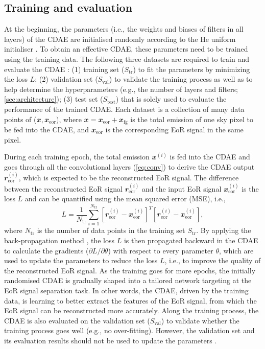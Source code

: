 \documentclass[fleqn,usenatbib]{mnras}
\newcommand{\R}[1]{\mathrm{#1}}
\newcommand{\B}[1]{\mathbfit{#1}}
\newcommand{\editone}[1]{{\leavevmode\color{cyan}#1}}
\begin{document}
\subsection{Training and evaluation}
\label{sec:train-eval}

\editone{%
At the beginning, the parameters (i.e., the weights and biases of filters
in all layers) of the CDAE are initialised randomly according to the He
uniform initialiser \citep{he2015}.
To obtain an effective CDAE, these parameters need to be trained using the
training data.
The following three datasets are required to train and evaluate the CDAE
\citep[e.g.,][]{ripley1996}:
(1) training set ($S_{\R{tr}}$) to fit the parameters by minimizing the
loss $L$;
(2) validation set ($S_{\R{val}}$) to validate the training process as well
as to help determine the hyperparameters (e.g., the number of layers and
filters; \autoref{sec:architecture});
(3) test set ($S_{\R{test}}$) that is solely used to evaluate the
performance of the trained CDAE.
Each dataset is a collection of many data points of
($\B{x}, \B{x}_{\R{eor}}$),
where $\B{x} = \B{x}_{\R{eor}} + \B{x}_{\R{fg}}$ is the total emission of
one sky pixel to be fed into the CDAE, and $\B{x}_{\R{eor}}$ is the
corresponding EoR signal in the same pixel.

During each training epoch, the total emission $\B{x}^{(i)}$ is fed into
the CDAE and goes through all the convolutional layers (\autoref{eq:conv})
to derive the CDAE output $\B{r}^{(i)}_{\R{eor}}$, which is expected to be
the reconstructed EoR signal.
The difference between the reconstructed EoR signal $\B{r}^{(i)}_{\R{eor}}$
and the input EoR signal $\B{x}^{(i)}_{\R{eor}}$ is the loss $L$ and can be
quantified using the mean squared error (MSE), i.e.,
\begin{equation}
  \label{eq:loss}
  L = \frac{1}{N_{\R{tr}}} \sum_{i=1}^{N_{\R{tr}}}
    \left[ \B{r}_{\R{eor}}^{(i)} - \B{x}_{\R{eor}}^{(i)} \right]^T
    \left[ \B{r}_{\R{eor}}^{(i)} - \B{x}_{\R{eor}}^{(i)} \right],
\end{equation}
where $N_{\R{tr}}$ is the number of data points in the training set
$S_{\R{tr}}$.
By applying the back-propagation method
\citep[e.g.,][]{rumelhart1986,lecun1998bp},
the loss $L$ is then propagated backward in the CDAE to calculate the
gradients ($\partial L / \partial \theta$) with respect to every parameter
$\theta$, which are used to update the parameters to reduce the loss $L$,
i.e., to improve the quality of the reconstructed EoR signal.
As the training goes for more epochs, the initially randomised CDAE is
gradually shaped into a tailored network targeting at the EoR signal
separation task.
In other words, the CDAE, driven by the training data, is learning to
better extract the features of the EoR signal, from which the EoR signal
can be reconstructed more accurately.
Along the training process, the CDAE is also evaluated on the validation
set ($S_{\R{val}}$) to validate whether the training process goes well
(e.g., no over-fitting).
However, the validation set and its evaluation results should not be used
to update the parameters \citep[e.g.,][]{russell2009}.
} %
\end{document}

